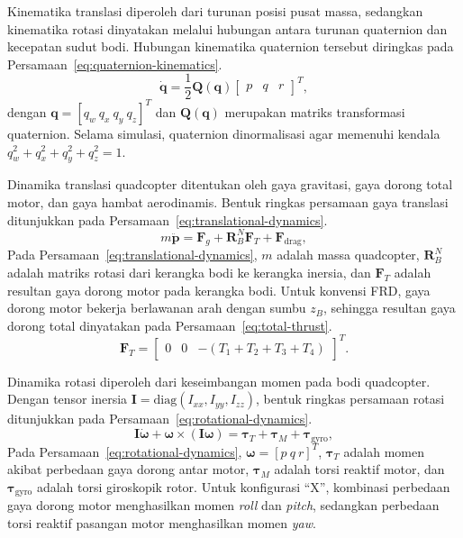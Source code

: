 \documentclass[12pt,a4paper]{report}
\numberwithin{equation}{chapter}
\begin{document}
Kinematika translasi diperoleh dari turunan posisi pusat massa, sedangkan kinematika rotasi dinyatakan melalui hubungan antara turunan quaternion dan kecepatan sudut bodi. Hubungan kinematika quaternion tersebut diringkas pada Persamaan~\ref{eq:quaternion-kinematics}.
\begin{equation}
    \dot{\mathbf{q}} = \frac{1}{2}\mathbf{Q}(\mathbf{q})
    \begin{bmatrix}
        p & q & r
    \end{bmatrix}^{T},
    \label{eq:quaternion-kinematics}
\end{equation}
dengan $\mathbf{q}=[q_w\ q_x\ q_y\ q_z]^T$ dan $\mathbf{Q}(\mathbf{q})$ merupakan matriks transformasi quaternion. Selama simulasi, quaternion dinormalisasi agar memenuhi kendala $q_w^2+q_x^2+q_y^2+q_z^2=1$.

Dinamika translasi quadcopter ditentukan oleh gaya gravitasi, gaya dorong total motor, dan gaya hambat aerodinamis. Bentuk ringkas persamaan gaya translasi ditunjukkan pada Persamaan~\ref{eq:translational-dynamics}.
\begin{equation}
    m\ddot{\mathbf{p}} = \mathbf{F}_g + \mathbf{R}_{B}^{N}\mathbf{F}_T + \mathbf{F}_{\mathrm{drag}},
    \label{eq:translational-dynamics}
\end{equation}
Pada Persamaan~\ref{eq:translational-dynamics}, $m$ adalah massa quadcopter, $\mathbf{R}_{B}^{N}$ adalah matriks rotasi dari kerangka bodi ke kerangka inersia, dan $\mathbf{F}_T$ adalah resultan gaya dorong motor pada kerangka bodi. Untuk konvensi FRD, gaya dorong motor bekerja berlawanan arah dengan sumbu $z_B$, sehingga resultan gaya dorong total dinyatakan pada Persamaan~\ref{eq:total-thrust}.
\begin{equation}
    \mathbf{F}_T =
    \begin{bmatrix}
        0 & 0 & -(T_1+T_2+T_3+T_4)
    \end{bmatrix}^{T}.
    \label{eq:total-thrust}
\end{equation}

Dinamika rotasi diperoleh dari keseimbangan momen pada bodi quadcopter. Dengan tensor inersia $\mathbf{I}=\mathrm{diag}(I_{xx},I_{yy},I_{zz})$, bentuk ringkas persamaan rotasi ditunjukkan pada Persamaan~\ref{eq:rotational-dynamics}.
\begin{equation}
    \mathbf{I}\dot{\boldsymbol{\omega}} + \boldsymbol{\omega}\times(\mathbf{I}\boldsymbol{\omega})
    = \boldsymbol{\tau}_{T} + \boldsymbol{\tau}_{M} + \boldsymbol{\tau}_{\mathrm{gyro}},
    \label{eq:rotational-dynamics}
\end{equation}
Pada Persamaan~\ref{eq:rotational-dynamics}, $\boldsymbol{\omega}=[p\ q\ r]^T$, $\boldsymbol{\tau}_{T}$ adalah momen akibat perbedaan gaya dorong antar motor, $\boldsymbol{\tau}_{M}$ adalah torsi reaktif motor, dan $\boldsymbol{\tau}_{\mathrm{gyro}}$ adalah torsi giroskopik rotor. Untuk konfigurasi ``X'', kombinasi perbedaan gaya dorong motor menghasilkan momen \textit{roll} dan \textit{pitch}, sedangkan perbedaan torsi reaktif pasangan motor menghasilkan momen \textit{yaw}.
\end{document}

